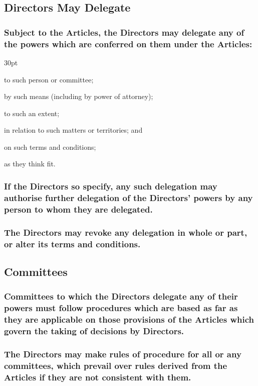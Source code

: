 \documentclass[12pt]{article}
\def\clauseindent{30pt}
\newenvironment{subindentpara}{\raggedright\begin{adjustwidth}{\clauseindent}{}\begin{hanginglist}}{\end{hanginglist}\end{adjustwidth}}
\begin{document}
\subsection{Directors May Delegate}
\subsubsection[Specifics of Directors' Delegation]{Subject to the Articles, the Directors may delegate any of the powers which are conferred on them under the Articles:}
\begin{subindentpara}
    \item to such person or committee;
    \item by such means (including by power of attorney);
    \item to such an extent;
    \item in relation to such matters or territories; and
    \item on such terms and conditions;
    \item as they think fit.
\end{subindentpara}
\subsubsection[Delegation May Be Extended]{If the Directors so specify, any such delegation may authorise further delegation of the Directors' powers by any person to whom they are delegated.}
\subsubsection[Delegation May Be Revoked or Modified]{The Directors may revoke any delegation in whole or part, or alter its terms and conditions.}

\subsection{Committees}
\subsubsection[Committees Must Comply with Procedures]{Committees to which the Directors delegate any of their powers must follow procedures which are based as far as they are applicable on those provisions of the Articles which govern the taking of decisions by Directors.}
\subsubsection[Rules of Procedure Prevail]{The Directors may make rules of procedure for all or any committees, which prevail over rules derived from the Articles if they are not consistent with them.}
\end{document}
